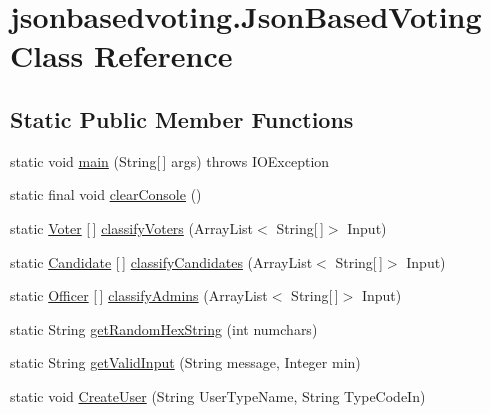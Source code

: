 \hypertarget{classjsonbasedvoting_1_1_json_based_voting}{}\section{jsonbasedvoting.\+Json\+Based\+Voting Class Reference}
\label{classjsonbasedvoting_1_1_json_based_voting}
\subsection*{Static Public Member Functions}
\begin{DoxyCompactItemize}
\item 
static void \mbox{\hyperlink{classjsonbasedvoting_1_1_json_based_voting_a39d87f4c78499d4c595529d34b656f82}{main}} (String\mbox{[}$\,$\mbox{]} args)  throws I\+O\+Exception 
\item 
static final void \mbox{\hyperlink{classjsonbasedvoting_1_1_json_based_voting_a1d797d0d870297df5f50f56ab63fb7d8}{clear\+Console}} ()
\item 
static \mbox{\hyperlink{classjsonbasedvoting_1_1_voter}{Voter}} \mbox{[}$\,$\mbox{]} \mbox{\hyperlink{classjsonbasedvoting_1_1_json_based_voting_a6f76956192c5ec8d7704c20bcc967d91}{classify\+Voters}} (Array\+List$<$ String\mbox{[}$\,$\mbox{]}$>$ Input)
\item 
static \mbox{\hyperlink{classjsonbasedvoting_1_1_candidate}{Candidate}} \mbox{[}$\,$\mbox{]} \mbox{\hyperlink{classjsonbasedvoting_1_1_json_based_voting_a09a09c0673c510a648d225136e4cf259}{classify\+Candidates}} (Array\+List$<$ String\mbox{[}$\,$\mbox{]}$>$ Input)
\item 
static \mbox{\hyperlink{classjsonbasedvoting_1_1_officer}{Officer}} \mbox{[}$\,$\mbox{]} \mbox{\hyperlink{classjsonbasedvoting_1_1_json_based_voting_a8ae3b015105859acfa80cfcf3e481174}{classify\+Admins}} (Array\+List$<$ String\mbox{[}$\,$\mbox{]}$>$ Input)
\item 
static String \mbox{\hyperlink{classjsonbasedvoting_1_1_json_based_voting_a1bce9a2d9ca3518b754e4f4506826b7b}{get\+Random\+Hex\+String}} (int numchars)
\item 
static String \mbox{\hyperlink{classjsonbasedvoting_1_1_json_based_voting_ac532552d0367e4f16155ea8bec904f88}{get\+Valid\+Input}} (String message, Integer min)
\item 
static void \mbox{\hyperlink{classjsonbasedvoting_1_1_json_based_voting_ad2f672b45638c0a0767c01bf51c8098a}{Create\+User}} (String User\+Type\+Name, String Type\+Code\+In)

\end{DoxyCompactItemize}

